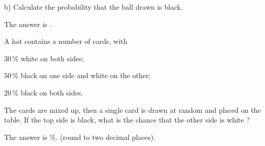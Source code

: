 \documentclass{ximera}
\begin{document}
\begin{question}
b) Calculate the probability that the ball drawn is black.
     \begin{solution}
           The answer is .
     \end{solution}
\end{question}

\begin{question}
A hat contains a number of cards, with

$30\,\%$ white on both sides;

$50\,\%$ black on one side and white on the other;

$20\,\%$ black on both sides.

The cards are mixed up, then a single card is drawn at random and placed on the table. If the top side is black, what is the chance that the other side is white ?
     \begin{solution}
           The answer is  $\%$. (round to two decimal places).
     \end{solution}
\end{question}
\end{document}
